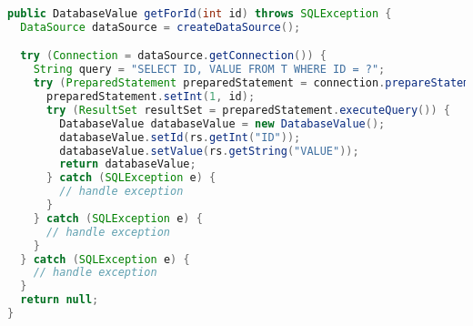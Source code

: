 
\begin{lstlisting}[language=Java, caption={Example of loading data from Oracle database using try-with-resources}, label={code:jdbc-try-with-resources}]
public DatabaseValue getForId(int id) throws SQLException {
  DataSource dataSource = createDataSource();

  try (Connection = dataSource.getConnection()) {
    String query = "SELECT ID, VALUE FROM T WHERE ID = ?";
    try (PreparedStatement preparedStatement = connection.prepareStatement(query)) {
      preparedStatement.setInt(1, id);
      try (ResultSet resultSet = preparedStatement.executeQuery()) {
        DatabaseValue databaseValue = new DatabaseValue();
        databaseValue.setId(rs.getInt("ID"));
        databaseValue.setValue(rs.getString("VALUE"));
        return databaseValue;
      } catch (SQLException e) {
        // handle exception
      }
    } catch (SQLException e) {
      // handle exception
    }
  } catch (SQLException e) {
    // handle exception
  }
  return null;
}
\end{lstlisting}
